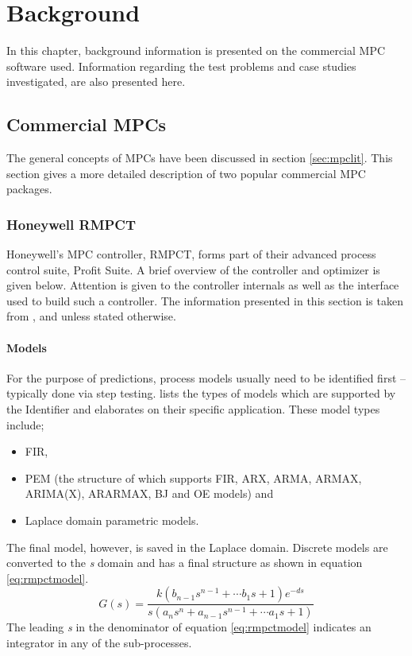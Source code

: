 \chapter{Background}\label{chap:background}
\begin{overview}
  In this chapter, background information is presented on the commercial MPC software used. 
  Information regarding the test problems and case studies investigated, are also presented here.
\end{overview}

\section{Commercial MPCs}
The general concepts of MPCs have been discussed in section \ref{sec:mpclit}.
This section gives a more detailed description of two popular commercial MPC packages.
\subsection{Honeywell RMPCT}
Honeywell's MPC controller, RMPCT, forms part of their advanced process control suite, Profit Suite.
A brief overview of the controller and optimizer is given below. 
Attention is given to the controller internals as well as the interface used to build such a controller.
The information presented in this section is taken from \citet{honeywell1}, \citet{honeywell2} and \citet{honeywell3} unless stated otherwise.

\subsubsection{Models}
For the purpose of predictions, process models usually need to be identified first -- typically done via step testing.
\citet{honeywell3} lists the types of models which are supported by the Identifier and elaborates on their specific application.
These model types include;
\begin{itemize}
\item FIR,
\item PEM (the structure of which supports FIR, ARX, ARMA, ARMAX, ARIMA(X), ARARMAX, BJ and OE models) and
\item Laplace domain parametric models.
\end{itemize}
The final model, however, is saved in the Laplace domain.
Discrete models are converted to the {\it s} domain and has a final structure as shown in equation \ref{eq:rmpctmodel}.
\begin{equation}
  \label{eq:rmpctmodel}
  G(s) = \frac{k(b_{n-1}s^{n-1}+ \cdots b_1s+1)e^{-ds}} {s(a_ns^n+a_{n-1}s^{n-1}+ \cdots a_1s+1)}
\end{equation}
The leading {\it s} in the denominator of equation \ref{eq:rmpctmodel} indicates an integrator in any of the sub-processes.

